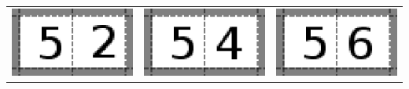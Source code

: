 \begin{table}[h!]
\begin{tabular}{c c c}
		\includegraphics[scale=1]{Example/AbstractInput/52.eps} & \includegraphics[scale=1]{Example/AbstractInput/54.eps} & \includegraphics[scale=1]{Example/AbstractInput/56.eps} \\
		\end{tabular}
\end{table}

\newpage
